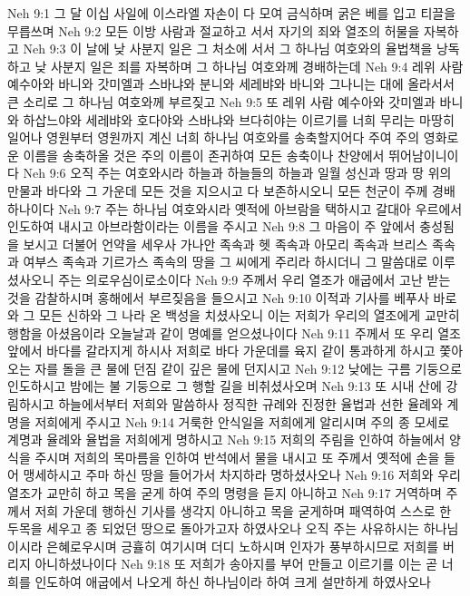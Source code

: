 Neh 9:1  그 달 이십 사일에 이스라엘 자손이 다 모여 금식하며 굵은 베를 입고 티끌을 무릅쓰며
Neh 9:2  모든 이방 사람과 절교하고 서서 자기의 죄와 열조의 허물을 자복하고
Neh 9:3  이 날에 낮 사분지 일은 그 처소에 서서 그 하나님 여호와의 율법책을 낭독하고 낮 사분지 일은 죄를 자복하며 그 하나님 여호와께 경배하는데
Neh 9:4  레위 사람 예수아와 바니와 갓미엘과 스바냐와 분니와 세레뱌와 바니와 그나니는 대에 올라서서 큰 소리로 그 하나님 여호와께 부르짖고
Neh 9:5  또 레위 사람 예수아와 갓미엘과 바니와 하삽느야와 세레뱌와 호다야와 스바냐와 브다히야는 이르기를 너희 무리는 마땅히 일어나 영원부터 영원까지 계신 너희 하나님 여호와를 송축할지어다 주여 주의 영화로운 이름을 송축하올 것은 주의 이름이 존귀하여 모든 송축이나 찬양에서 뛰어남이니이다
Neh 9:6  오직 주는 여호와시라 하늘과 하늘들의 하늘과 일월 성신과 땅과 땅 위의 만물과 바다와 그 가운데 모든 것을 지으시고 다 보존하시오니 모든 천군이 주께 경배하나이다
Neh 9:7  주는 하나님 여호와시라 옛적에 아브람을 택하시고 갈대아 우르에서 인도하여 내시고 아브라함이라는 이름을 주시고
Neh 9:8  그 마음이 주 앞에서 충성됨을 보시고 더불어 언약을 세우사 가나안 족속과 헷 족속과 아모리 족속과 브리스 족속과 여부스 족속과 기르가스 족속의 땅을 그 씨에게 주리라 하시더니 그 말씀대로 이루셨사오니 주는 의로우심이로소이다
Neh 9:9  주께서 우리 열조가 애굽에서 고난 받는 것을 감찰하시며 홍해에서 부르짖음을 들으시고
Neh 9:10  이적과 기사를 베푸사 바로와 그 모든 신하와 그 나라 온 백성을 치셨사오니 이는 저희가 우리의 열조에게 교만히 행함을 아셨음이라 오늘날과 같이 명예를 얻으셨나이다
Neh 9:11  주께서 또 우리 열조 앞에서 바다를 갈라지게 하시사 저희로 바다 가운데를 육지 같이 통과하게 하시고 쫓아 오는 자를 돌을 큰 물에 던짐 같이 깊은 물에 던지시고
Neh 9:12  낮에는 구름 기둥으로 인도하시고 밤에는 불 기둥으로 그 행할 길을 비취셨사오며
Neh 9:13  또 시내 산에 강림하시고 하늘에서부터 저희와 말씀하사 정직한 규례와 진정한 율법과 선한 율례와 계명을 저희에게 주시고
Neh 9:14  거룩한 안식일을 저희에게 알리시며 주의 종 모세로 계명과 율례와 율법을 저희에게 명하시고
Neh 9:15  저희의 주림을 인하여 하늘에서 양식을 주시며 저희의 목마름을 인하여 반석에서 물을 내시고 또 주께서 옛적에 손을 들어 맹세하시고 주마 하신 땅을 들어가서 차지하라 명하셨사오나
Neh 9:16  저희와 우리 열조가 교만히 하고 목을 굳게 하여 주의 명령을 듣지 아니하고
Neh 9:17  거역하며 주께서 저희 가운데 행하신 기사를 생각지 아니하고 목을 굳게하며 패역하여 스스로 한 두목을 세우고 종 되었던 땅으로 돌아가고자 하였사오나 오직 주는 사유하시는 하나님이시라 은혜로우시며 긍휼히 여기시며 더디 노하시며 인자가 풍부하시므로 저희를 버리지 아니하셨나이다
Neh 9:18  또 저희가 송아지를 부어 만들고 이르기를 이는 곧 너희를 인도하여 애굽에서 나오게 하신 하나님이라 하여 크게 설만하게 하였사오나
